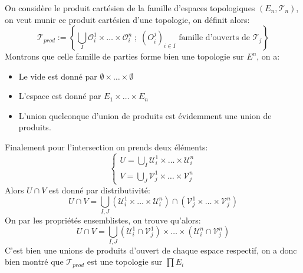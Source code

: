 \documentclass{report}
\begin{document}
      \subsection*{}
         On considère le produit cartésien de la famille d'espaces topologiques $(E_n, \mathcal{T}_n)$, on veut munir ce produit cartésien d'une topologie, on définit alors:
         $$
            \mathcal{T}_{prod} := \left\{\bigcup_{I} \mathcal{O}^1_{i} \times \ldots \times \mathcal{O}^n_{i} \; ; \; (O^j_{i})_{i \in I} \text{ famille d'ouverts de } \mathcal{T}_j \right\}
         $$
         Montrons que celle famille de parties forme bien une topologie sur $E^n$, on a:
         \begin{itemize}
            \item Le vide est donné par $\emptyset \times \ldots \times \emptyset$
            \item L'espace est donné par $E_1 \times \ldots \times E_n$
            \item L'union quelconque d'union de produits est évidemment une union de produits.
         \end{itemize}
         Finalement pour l'intersection on prends deux éléments:
         $$
            \begin{cases}
                  U = \bigcup_{I}\mathcal{U}^1_{i} \times \ldots \times \mathcal{U}^n_{i}\\
                  V = \bigcup_{J} \mathcal{V}^1_{j} \times \ldots \times \mathcal{V}^n_{j}
            \end{cases}
         $$
         Alors $U \cap V$ est donné par distributivité:
         $$
            U \cap V = \bigcup_{I, J} (\mathcal{U}^1_{i} \times \ldots \times \mathcal{U}^n_{i}) \cap (\mathcal{V}^1_{j} \times \ldots \times \mathcal{V}^n_{j})
         $$
         On par les propriétés ensemblistes, on trouve qu'alors:
         $$
            U \cap V = \bigcup_{I, J} (\mathcal{U}^1_{i} \cap \mathcal{V}^1_{j}) \times \ldots \times (\mathcal{U}^n_{i} \cap \mathcal{V}^n_{j})
         $$
         C'est bien une unions de produits d'ouvert de chaque espace respectif, on a donc bien montré que $\mathcal{T}_{prod}$ est une topologie sur $\prod E_i$
   
   \chapter*{}
\end{document}
